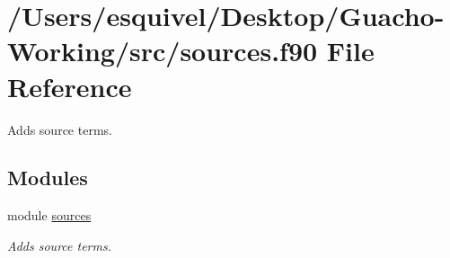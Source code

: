 \hypertarget{sources_8f90}{}\section{/\+Users/esquivel/\+Desktop/\+Guacho-\/\+Working/src/sources.f90 File Reference}
\label{sources_8f90}


Adds source terms.  


\subsection*{Modules}
\begin{DoxyCompactItemize}
\item 
module \hyperlink{namespacesources}{sources}
\begin{DoxyCompactList}\small\item\em Adds source terms. \end{DoxyCompactList}\end{DoxyCompactItemize}
